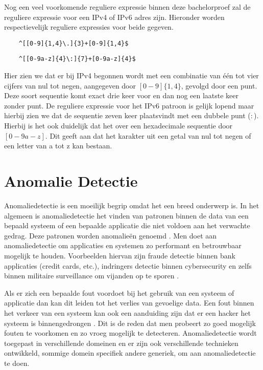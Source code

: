 Nog een veel voorkomende reguliere expressie binnen deze bachelorproef zal de reguliere expressie voor een IPv4 of IPv6 adres zijn. Hieronder worden respectievelijk reguliere expressies voor beide gegeven.
\begin{verbatim}
    ^[[0-9]{1,4}\.]{3}+[0-9]{1,4}$
\end{verbatim}
\begin{verbatim}
    ^[[0-9a-z]{4}\:]{7}+[0-9a-z]{4}$
\end{verbatim}
Hier zien we dat er bij IPv4 begonnen wordt met een combinatie van één tot vier cijfers van nul tot negen, aangegeven door \([0-9]\{1,4\}\), gevolgd door een punt. Deze soort sequentie komt exact drie keer voor en dan nog een laatste keer zonder punt. De reguliere expressie voor het IPv6 patroon is gelijk lopend maar hierbij zien we dat de sequentie zeven keer plaatsvindt met een dubbele punt (\(:\)). Hierbij is het ook duidelijk dat het over een hexadecimale sequentie door \([0-9a-z]\). Dit geeft aan dat het karakter uit een getal van nul tot negen of een letter van a tot z kan bestaan.

\section{Anomalie Detectie}

Anomaliedetectie is een moeilijk begrip omdat het een breed onderwerp is. In het algemeen is anomaliedetectie het vinden van patronen binnen de data van een bepaald systeem of een bepaalde applicatie die niet voldoen aan het verwachte gedrag. Deze patronen worden anomalieën genoemd \autocite{chandola2009anomaly}. Men doet aan anomaliedetectie om applicaties en systemen zo performant en betrouwbaar mogelijk te houden. Voorbeelden hiervan zijn fraude detectie binnen bank applicaties (credit cards, etc.), indringers detectie binnen cybersecurity en zelfs binnen militaire surveillance om vijanden op te sporen \autocite{chandola2009anomaly}. 

Als er zich een bepaalde fout voordoet bij het gebruik van een systeem of applicatie dan kan dit leiden tot het verlies van gevoelige data. Een fout binnen het verkeer van een systeem kan ook een aanduiding zijn dat er een hacker het systeem is binnengedrongen \autocite{chandola2009anomaly}. Dit is de reden dat men probeert zo goed mogelijk fouten te voorkomen en zo vroeg mogelijk te detecteren. Anomaliedetectie wordt toegepast in verschillende domeinen en er zijn ook verschillende technieken ontwikkeld, sommige domein specifiek andere generiek, om aan anomaliedetectie te doen. 

